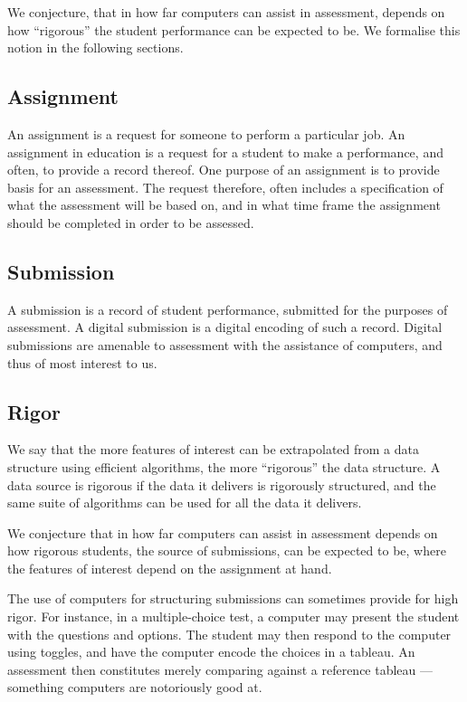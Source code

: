 We conjecture, that in how far computers can assist in assessment, depends on
how ``rigorous'' the student performance can be expected to be.  We formalise
this notion in the following sections.

\subsection{Assignment}

An assignment is a request for someone to perform a particular job.  An
assignment in education is a request for a student to make a performance, and
often, to provide a record thereof. One purpose of an assignment is to provide
basis for an assessment. The request therefore, often includes a specification
of what the assessment will be based on, and in what time frame the assignment
should be completed in order to be assessed.

\subsection{Submission}

A submission is a record of student performance, submitted for the purposes of
assessment. A digital submission is a digital encoding of such a record.
Digital submissions are amenable to assessment with the assistance of
computers, and thus of most interest to us.

\subsection{Rigor}

We say that the more features of interest can be extrapolated from a data
structure using efficient algorithms, the more ``rigorous'' the data structure.
A data source is rigorous if the data it delivers is rigorously structured, and
the same suite of algorithms can be used for all the data it delivers.

We conjecture that in how far computers can assist in assessment depends on how
rigorous students, the source of submissions, can be expected to be, where the
features of interest depend on the assignment at hand.

The use of computers for structuring submissions can sometimes provide for high
rigor. For instance, in a multiple-choice test, a computer may present the
student with the questions and options. The student may then respond to the
computer using toggles, and have the computer encode the choices in a tableau.
An assessment then constitutes merely comparing against a reference tableau ---
something computers are notoriously good at.

